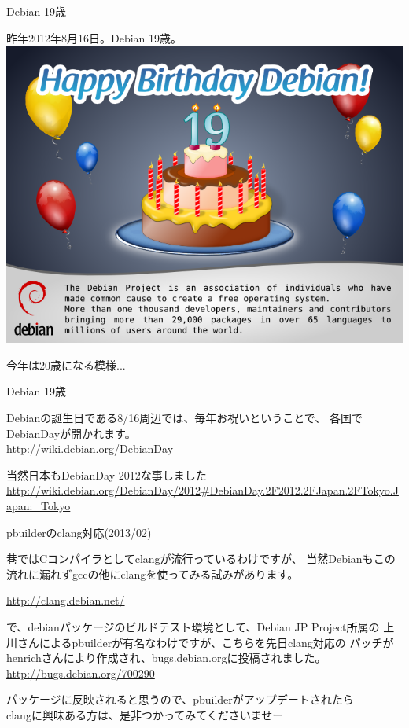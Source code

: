 \begin{frame}{Debian 19歳}
\begin{center}

\Large{昨年2012年8月16日。Debian 19歳。}\\
\includegraphics[width=0.8\hsize]{image201302/osc-tokyo/debian-19.png}
\end{center}
\Large{今年は20歳になる模様...}
\end{frame}

\begin{frame}{Debian 19歳}

 Debianの誕生日である8/16周辺では、毎年お祝いということで、
各国でDebianDayが開かれます。\\
\url{http://wiki.debian.org/DebianDay} 

 当然日本もDebianDay 2012な事しました\\
\url{http://wiki.debian.org/DebianDay/2012\#DebianDay.2F2012.2FJapan.2FTokyo.Japan:_Tokyo}

\end{frame}

\begin{frame}{pbuilderのclang対応(2013/02)}

 巷ではCコンパイラとしてclangが流行っているわけですが、
当然Debianもこの流れに漏れずgccの他にclangを使ってみる試みがあります。\\
\begin{center}
\url{http://clang.debian.net/}
\end{center}
 で、debianパッケージのビルドテスト環境として、Debian JP Project所属の
上川さんによるpbuilderが有名なわけですが、こちらを先日clang対応の
パッチがhenrichさんにより作成され、bugs.debian.orgに投稿されました。\\
\url{http://bugs.debian.org/700290}
\begin{center}
\Large
パッケージに反映されると思うので、pbuilderがアップデートされたら\\
clangに興味ある方は、是非つかってみてくださいませー
\end{center}
\end{frame}

